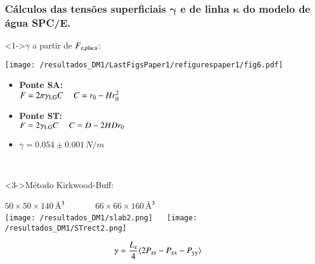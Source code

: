 \documentclass[8pt]{beamer}
\begin{document}
\begin{frame}
	\frametitle<1->{Cálculos das \textbf{tensões superficiais} $\boldsymbol{\gamma}$ \textbf{e de linha} $\boldsymbol{\kappa}$ do modelo de água SPC/E.}
	\begin{minipage}{0.48\textwidth}
		\begin{block}<1->{$\gamma$ a partir de  $F_{\rm z,placa}$:}
			\begin{center}
				\texttt{[image: /resultados\_DM1/LastFigsPaper1/refigurespaper1/fig6.pdf]}
			\end{center}
			\begin{itemize}
					\item<1-> \textbf{Ponte SA:}\\
					$F = 2\pi\gamma_{\rm LG} C ~~~~~ C = r_0 -  H r_0^2$
 					\item<1-> \textbf{Ponte ST:}\\
					$F = 2\gamma_{\rm LG} C ~~~~~ C = D - 2 H D r_0$
					\item<2-> $\gamma = 0.054 \pm0.001\,N/m$  						
			\end{itemize}
		\end{block}
	\end{minipage}
	~~
	\begin{minipage}{0.48\textwidth}
			\begin{block}<3->{Método Kirkwood-Buff:}
			\begin{center}
				 {\small $50\times50\times140$\,\AA$^{\rm 3}$~~~~~~~$66\times66\times160$\,\AA$^{\rm 3}$}\\
				\texttt{[image: /resultados\_DM1/slab2.png]}
				~~
				\texttt{[image: /resultados\_DM1/STrect2.png]}  \\
			\end{center}
				   $$\gamma = \frac{L_{\rm z}}{4} \langle 2 P_{\rm zz}  - P_{\rm xx} -P_{\rm yy} \rangle $$
\end{block}
\end{minipage}
\end{frame}
\end{document}
